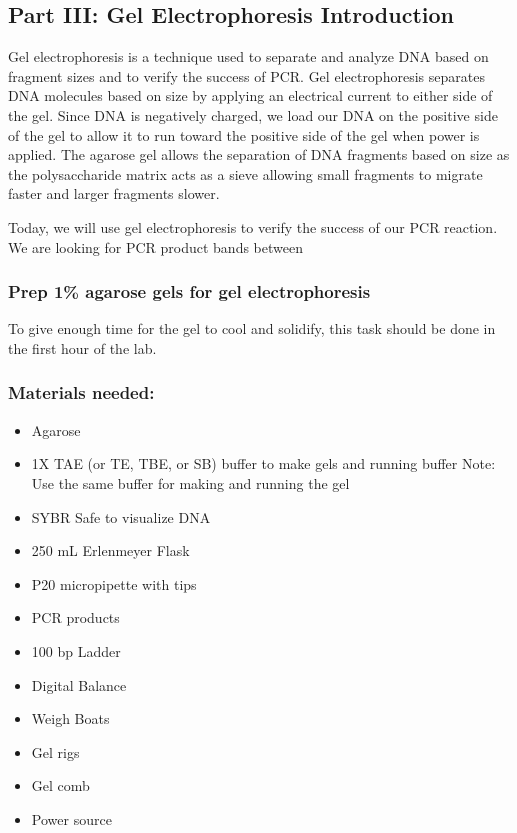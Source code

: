 \documentclass[
  letterpaper,
  DIV=11,
  numbers=noendperiod]{scrreprt}
\providecommand{\tightlist}{%
  \setlength{\itemsep}{0pt}\setlength{\parskip}{0pt}}
\begin{document}
\subsection*{Part III: Gel Electrophoresis
Introduction}\label{part-iii-gel-electrophoresis-introduction}

Gel electrophoresis is a technique used to separate and analyze DNA
based on fragment sizes and to verify the success of PCR. Gel
electrophoresis separates DNA molecules based on size by applying an
electrical current to either side of the gel. Since DNA is negatively
charged, we load our DNA on the positive side of the gel to allow it to
run toward the positive side of the gel when power is applied. The
agarose gel allows the separation of DNA fragments based on size as the
polysaccharide matrix acts as a sieve allowing small fragments to
migrate faster and larger fragments slower.

Today, we will use gel electrophoresis to verify the success of our PCR
reaction. We are looking for PCR product bands between

\subsubsection*{Prep 1\% agarose gels for gel
electrophoresis}\label{prep-1-agarose-gels-for-gel-electrophoresis}

To give enough time for the gel to cool and solidify, this task should
be done in the first hour of the lab.

\subsubsection*{Materials needed:}\label{materials-needed}

\begin{itemize}
\tightlist
\item
  Agarose
\item
  1X TAE (or TE, TBE, or SB) buffer to make gels and running buffer
  Note: Use the same buffer for making and running the gel
\item
  SYBR Safe to visualize DNA
\item
  250 mL Erlenmeyer Flask
\item
  P20 micropipette with tips
\item
  PCR products
\item
  100 bp Ladder
\item
  Digital Balance
\item
  Weigh Boats
\item
  Gel rigs
\item
  Gel comb
\item
  Power source
\end{itemize}
\end{document}
